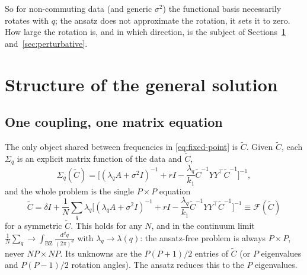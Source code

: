 \documentclass[11pt,a4paper]{article}
\newcommand{\Ct}{\tilde C}
\begin{document}
So for non-commuting data (and generic $\sigma^2$) the functional basis necessarily rotates with $q$; the ansatz does not approximate the rotation, it sets it to zero. How large the rotation is, and in which direction, is the subject of Sections~\ref{sec:structure} and~\ref{sec:perturbative}.

\section{Structure of the general solution}
\label{sec:structure}

\subsection{One coupling, one matrix equation}
The only object shared between frequencies in \eqref{eq:fixed-point} is $\Ct$. Given $\Ct$, each $\Sigma_q$ is an explicit matrix function of the data and $\Ct$,
\begin{equation}
  \Sigma_q(\Ct) = \Big[(\lambda_q A + \sigma^2 I)^{-1} + r I - \frac{\lambda_q}{k_1}\Ct^{-1} YY^\top \Ct^{-1}\Big]^{-1},
\end{equation}
and the whole problem is the single $P\times P$ equation
\begin{equation}
  \boxed{\;
  \Ct = \delta I + \frac1N \sum_q \lambda_q\Big[(\lambda_q A + \sigma^2 I)^{-1} + r I - \frac{\lambda_q}{k_1}\Ct^{-1} YY^\top \Ct^{-1}\Big]^{-1}
  \equiv \mathcal F(\Ct)\; }
  \label{eq:master}
\end{equation}
for a symmetric $\Ct$. This holds for any $N$, and in the continuum limit $\frac1N\sum_q \to \int_{\mathrm{BZ}}\frac{\mathrm d^dq}{(2\pi)^d}$ with $\lambda_q \to \lambda(q)$: the ansatz-free problem is always $P\times P$, never $NP\times NP$. Its unknowns are the $P(P+1)/2$ entries of $\Ct$ (or $P$ eigenvalues and $P(P-1)/2$ rotation angles). The ansatz reduces this to the $P$ eigenvalues.
\end{document}
